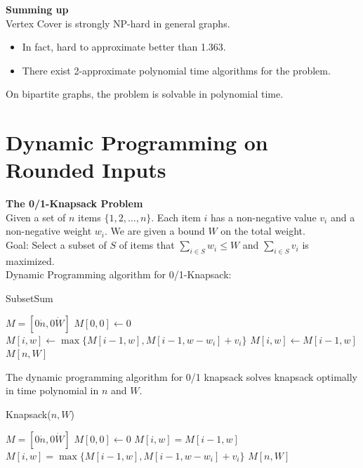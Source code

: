 \documentclass[onecolumn]{report}
\begin{document}
\textbf{Summing up}\\
Vertex Cover is strongly NP-hard in general graphs.
\begin{itemize}
    \item In fact, hard to approximate better than 1.363.
    \item There exist 2-approximate polynomial time algorithms for the problem.
\end{itemize}
On bipartite graphs, the problem is solvable in polynomial time.


\section{Dynamic Programming on Rounded Inputs}
\textbf{The 0/1-Knapsack Problem}\\
Given a set of $n$ items $\{1,2,\dots,n\}$. Each item $i$ has a non-negative value $v_i$ and a non-negative weight $w_i$. We are given a bound $W$ on the total weight.\\
Goal: Select a subset of $S$ of items that $\sum_{i \in S} w_i \leq W$ and $\sum_{i \in S} v_i$ is maximized.\\
Dynamic Programming algorithm for 0/1-Knapsack:
\begin{algorithm}[H]
\caption{SubsetSum}
\begin{algorithmic}[1]
    \State $M=[0\dot n,0\dot W]$
    \State $M[0,0] \gets 0$
                \State $M[i,w] \gets \max\{M[i-1,w], M[i-1,w-w_i]+v_i\}$
            \Else
                \State $M[i,w] \gets M[i-1,w]$
            \EndIf
        \EndFor
    \EndFor
    \State \Return $M[n,W]$
\end{algorithmic}
\end{algorithm}
\noindent
The dynamic programming algorithm for 0/1 knapsack solves knapsack optimally in time polynomial in $n$ and $W$.
\begin{algorithm}[H]
\caption{Knapsack($n,W$)}
\begin{algorithmic}[1]
    \State $M=[0\dot n,0\dot W]$
    \State $M[0,0] \gets 0$
                \State $M[i,w] = M[i-1,w]$
            \Else
                \State $M[i,w] = \max\{M[i-1,w], M[i-1,w-w_i]+v_i\}$
            \EndIf
        \EndFor
    \EndFor
    \State \Return $M[n,W]$
\end{algorithmic}
\end{algorithm}
\noindent
\end{document}
